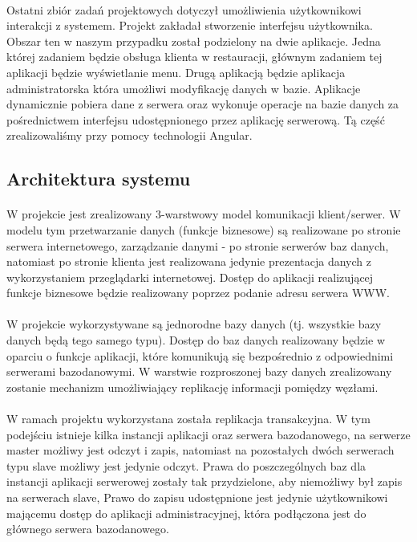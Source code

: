 \documentclass{article}
\begin{document}
	\paragraph{}
	Ostatni zbiór zadań projektowych dotyczył umożliwienia użytkownikowi interakcji z systemem. Projekt zakładał stworzenie interfejsu użytkownika. Obszar ten w naszym przypadku został podzielony na dwie aplikacje. Jedna której zadaniem będzie obsługa klienta w restauracji, głównym zadaniem tej aplikacji będzie wyświetlanie menu. Drugą aplikacją będzie aplikacja administratorska która umożliwi modyfikację danych w bazie. Aplikacje dynamicznie pobiera dane z serwera oraz wykonuje operacje na bazie danych za pośrednictwem interfejsu udostępnionego przez aplikację serwerową. Tą część zrealizowaliśmy przy pomocy technologii Angular. 
	

	\subsection{Architektura systemu}  
	\paragraph{}
	W projekcie jest zrealizowany 3-warstwowy model komunikacji klient/serwer. W modelu tym przetwarzanie danych (funkcje biznesowe) są realizowane po stronie serwera internetowego, zarządzanie danymi - po stronie serwerów baz danych, natomiast po stronie klienta jest realizowana jedynie prezentacja danych z wykorzystaniem przeglądarki internetowej. Dostęp do aplikacji realizującej funkcje biznesowe będzie realizowany poprzez podanie adresu serwera WWW.
	\paragraph{}
	W projekcie wykorzystywane są jednorodne bazy danych (tj. wszystkie bazy danych będą tego samego typu). Dostęp do baz danych realizowany będzie w oparciu o funkcje aplikacji, które komunikują się bezpośrednio z odpowiednimi serwerami bazodanowymi. W warstwie rozproszonej bazy danych zrealizowany zostanie mechanizm umożliwiający replikację informacji pomiędzy węzłami.
	\paragraph{}
	W ramach projektu wykorzystana została replikacja transakcyjna. W tym podejściu istnieje kilka instancji aplikacji oraz serwera bazodanowego, na serwerze master możliwy jest odczyt i zapis, natomiast na pozostałych dwóch serwerach typu slave możliwy jest jedynie odczyt. Prawa do poszczególnych baz dla instancji aplikacji serwerowej zostały tak przydzielone, aby niemożliwy był zapis na serwerach slave, Prawo do zapisu udostępnione jest jedynie użytkownikowi mającemu dostęp do aplikacji administracyjnej, która podłączona jest do głównego serwera bazodanowego.
\end{document}
